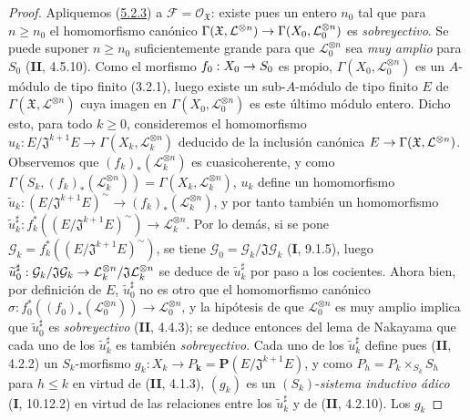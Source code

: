 \documentclass[10pt,oneside,openany]{book}
\theoremstyle{egaenv}\newtheorem*{env}{---}
\theoremstyle{egastatement}
\theoremstyle{egadescription}
\renewcommand{\leq}{\leqslant}
\renewcommand{\geq}{\geqslant}
\renewcommand{\to}{\mathchoice{\longrightarrow}{\rightarrow}{\rightarrow}{\rightarrow}}
\begin{document}
\begin{proof}
Apliquemos (\hyperref[III.5.2.3-fr]{5.2.3}) a
$\mathcal F=\mathcal O_{\mathfrak X}$: existe pues un entero $n_0$ tal que
para $n\geq n_0$ el homomorfismo canónico
$\Gamma(\mathfrak X,\mathcal L^{\otimes n})\to
\Gamma(X_0,\mathcal L_0^{\otimes n})$ es \emph{sobreyectivo}. Se puede suponer
$n\geq n_0$ suficientemente grande para que $\mathcal L_0^{\otimes n}$ sea \emph{muy
amplio} para $S_0$ (\textbf{II}, 4.5.10). Como el morfismo $f_0:X_0\to S_0$ es propio,
$\Gamma(X_0,\mathcal L_0^{\otimes n})$ es un $A$-módulo de tipo finito (3.2.1),
luego existe un sub-$A$-módulo de tipo finito $E$ de
$\Gamma(\mathfrak X,\mathcal L^{\otimes n})$ cuya imagen en
$\Gamma(X_0,\mathcal L_0^{\otimes n})$ es este último módulo entero.
Dicho esto, para todo $k\geq0$, consideremos el homomorfismo
$u_k:E/\mathfrak J^{k+1}E\longrightarrow
\Gamma(X_k,\mathcal L_k^{\otimes n})$
deducido de la inclusión canónica
$E\to\Gamma(\mathfrak X,\mathcal L^{\otimes n})$. Observemos que
$(f_k)_*(\mathcal L_k^{\otimes n})$ es cuasicoherente, y como
$\Gamma(S_k,(f_k)_*(\mathcal L_k^{\otimes n}))
=\Gamma(X_k,\mathcal L_k^{\otimes n})$, $u_k$ define un homomorfismo
$\widetilde u_k:(E/\mathfrak J^{k+1}E)^\sim
\longrightarrow(f_k)_*(\mathcal L_k^{\otimes n})$,
y por tanto también un homomorfismo
$\widetilde u_k^\sharp:
f_k^*((E/\mathfrak J^{k+1}E)^\sim)\longrightarrow
\mathcal L_k^{\otimes n}$.
Por lo demás, si se pone
$\mathcal G_k=f_k^*((E/\mathfrak J^{k+1}E)^\sim)$, se tiene
$\mathcal G_0=\mathcal G_k/\mathfrak J\mathcal G_k$ (\textbf{I}, 9.1.5), luego
$\widetilde u_0^\sharp:\mathcal G_k/\mathfrak J\mathcal G_k
\to\mathcal L_k^{\otimes n}/\mathfrak J\mathcal L_k^{\otimes n}$ se deduce
de $\widetilde u_k^\sharp$ por paso a los cocientes. Ahora bien, por definición de
$E$, $\widetilde u_0^\sharp$ no es otro que el homomorfismo canónico
$\sigma:f_0^*((f_0)_*(\mathcal L_0^{\otimes n}))\longrightarrow
\mathcal L_0^{\otimes n}$,
y la hipótesis de que $\mathcal L_0^{\otimes n}$ es muy amplio implica que
$\widetilde u_0^\sharp$ es \emph{sobreyectivo} (\textbf{II}, 4.4.3); se deduce entonces del lema
de Nakayama que cada uno de los $\widetilde u_k^\sharp$ es también \emph{sobreyectivo}.
Cada uno de los $\widetilde u_k^\sharp$ define pues (\textbf{II}, 4.2.2) un
$S_k$-morfismo
$g_k:X_k\longrightarrow P_{\boldsymbol{k}}=\mathbf P(E/\mathfrak J^{k+1}E)$,
y como $P_h=P_k\times_{S_k}S_h$ para $h\leq k$ en virtud de (\textbf{II}, 4.1.3),
$(g_k)$ es un $(S_k)$-\emph{sistema inductivo ádico} (\textbf{I}, 10.12.2) en virtud de las
relaciones entre los $\widetilde u_k^\sharp$ y de (\textbf{II}, 4.2.10). Los $g_k$

\end{proof}
\end{document}
